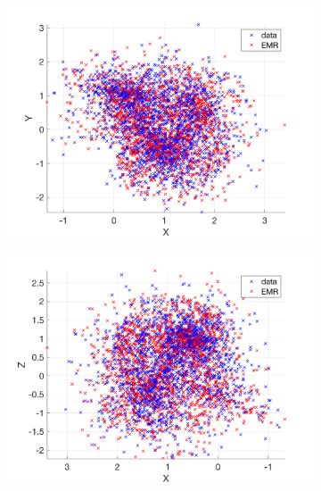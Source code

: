 \documentclass[12pt]{article}
\begin{document}
\begin{figure}[H]
	\centering
	\begin{subfigure}[b]{0.3\textwidth}
		\centering
		\includegraphics[width=\textwidth]{plots/l84l63/traj1l84.png}
	\end{subfigure}
	\hfill
	\begin{subfigure}[b]{0.3\textwidth}
		\centering
		\includegraphics[width=\textwidth]{plots/l84l63/traj2l84.png}
	\end{subfigure}
	\hfill
	\begin{subfigure}[b]{0.3\textwidth}
		\centering

\end{subfigure}
\end{figure}
\end{document}
